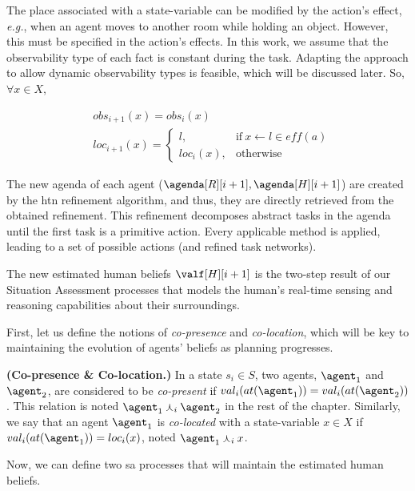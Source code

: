 The place associated with a state-variable can be modified by the action's effect, \textit{e.g.}, when an agent moves to another room while holding an object. However, this must be specified in the action's effects. 
In this work, we assume that the observability type of each fact is constant during the task. Adapting the approach to allow dynamic observability types is feasible, which will be discussed later.
So, $\forall x \in X$,

\begin{align} \label{eq:obs_update}
    &obs_{i+1}(x) = obs_i(x) \\
    &loc_{i+1}(x) = \left\{ 
    \begin{array}{ll}
        l, & \mbox{if} ~ x \leftarrow l \in \textit{eff}(a)\\
        loc_i(x), & \mbox{otherwise}
    \end{array}\right.
\end{align}

The new agenda of each agent ($\agenda[R][i+1], \agenda[H][i+1]$) are created by the \acrshort{htn} refinement algorithm, and thus, they are directly retrieved from the obtained refinement. 
This refinement decomposes abstract tasks in the agenda until the first task is a primitive action. Every applicable method is applied, leading to a set of possible actions (and refined task networks).

The new estimated human beliefs $\valf[H][i+1]$ is the two-step result of our Situation Assessment processes that models the human's real-time sensing and reasoning capabilities about their surroundings.

First, let us define the notions of \textit{co-presence} and \textit{co-location}, which will be key to maintaining the evolution of agents' beliefs as planning progresses.

\begin{definition} \label{def:co-pre-loc}
    \textbf{(Co-presence \& Co-location.)} In a state $s_i \in S$, two agents, $\agent_1$ and $\agent_2$, are considered to be \emph{co-present} if $val_i(at(\agent_1)) = val_i(at(\agent_2))$. This relation is noted $\agent_1 \curlywedge_i \agent_2$ in the rest of the chapter. Similarly, we say that an agent $\agent_1$ is \textit{co-located} with a state-variable $x \in X$ if $val_i(at(\agent_1)) = loc_i(x)$, noted $\agent_1 \curlywedge_i x$.
\end{definition}

Now, we can define two \acrfull{sa} processes that will maintain the estimated human beliefs.

